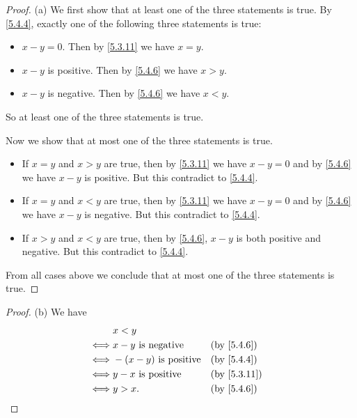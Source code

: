 \begin{proof}{(a)}
  We first show that at least one of the three statements is true.
  By \cref{5.4.4}, exactly one of the following three statements is true:
  \begin{itemize}
    \item \(x - y = 0\).
          Then by \cref{5.3.11} we have \(x = y\).
    \item \(x - y\) is positive.
          Then by \cref{5.4.6} we have \(x > y\).
    \item \(x - y\) is negative.
          Then by \cref{5.4.6} we have \(x < y\).
  \end{itemize}
  So at least one of the three statements is true.

  Now we show that at most one of the three statements is true.
  \begin{itemize}
    \item If \(x = y\) and \(x > y\) are true, then by \cref{5.3.11} we have \(x - y = 0\) and by \cref{5.4.6} we have \(x - y\) is positive.
          But this contradict to \cref{5.4.4}.
    \item If \(x = y\) and \(x < y\) are true, then by \cref{5.3.11} we have \(x - y = 0\) and by \cref{5.4.6} we have \(x - y\) is negative.
          But this contradict to \cref{5.4.4}.
    \item If \(x > y\) and \(x < y\) are true, then by \cref{5.4.6}, \(x - y\) is both positive and negative.
          But this contradict to \cref{5.4.4}.
  \end{itemize}
  From all cases above we conclude that at most one of the three statements is true.
\end{proof}

\begin{proof}{(b)}
  We have
  \begin{align*}
         & x < y                                                       \\
    \iff & x - y \text{ is negative}    &  & \by{5.4.6}                \\
    \iff & -(x - y) \text{ is positive} &  & \by{5.4.4}                \\
    \iff & y - x \text{ is positive}    &  & \text{(by \cref{5.3.11})} \\
    \iff & y > x.                       &  & \by{5.4.6}
  \end{align*}
\end{proof}

